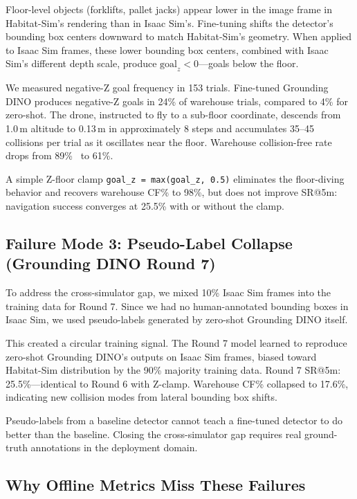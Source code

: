 \documentclass[conference]{IEEEtran}
\begin{document}
Floor-level objects (forklifts, pallet jacks) appear lower in the image frame in Habitat-Sim's rendering than in Isaac Sim's. Fine-tuning shifts the detector's bounding box centers downward to match Habitat-Sim's geometry. When applied to Isaac Sim frames, these lower bounding box centers, combined with Isaac Sim's different depth scale, produce $\text{goal}_z < 0$---goals below the floor.

We measured negative-Z goal frequency in 153 trials. Fine-tuned Grounding DINO produces negative-Z goals in 24\% of warehouse trials, compared to 4\% for zero-shot. The drone, instructed to fly to a sub-floor coordinate, descends from 1.0\,m altitude to 0.13\,m in approximately 8 steps and accumulates 35--45 collisions per trial as it oscillates near the floor. Warehouse collision-free rate drops from 89\%~\cite{anon2026engineering} to 61\%.

A simple Z-floor clamp \verb|goal_z = max(goal_z, 0.5)| eliminates the floor-diving behavior and recovers warehouse CF\% to 98\%, but does not improve SR@5m: navigation success converges at 25.5\% with or without the clamp.

\subsection{Failure Mode 3: Pseudo-Label Collapse (Grounding DINO Round 7)}

To address the cross-simulator gap, we mixed 10\% Isaac Sim frames into the training data for Round 7. Since we had no human-annotated bounding boxes in Isaac Sim, we used pseudo-labels generated by zero-shot Grounding DINO itself.

This created a circular training signal. The Round 7 model learned to reproduce zero-shot Grounding DINO's outputs on Isaac Sim frames, biased toward Habitat-Sim distribution by the 90\% majority training data. Round 7 SR@5m: 25.5\%---identical to Round 6 with Z-clamp. Warehouse CF\% collapsed to 17.6\%, indicating new collision modes from lateral bounding box shifts.

Pseudo-labels from a baseline detector cannot teach a fine-tuned detector to do better than the baseline. Closing the cross-simulator gap requires real ground-truth annotations in the deployment domain.

\subsection{Why Offline Metrics Miss These Failures}
\end{document}
